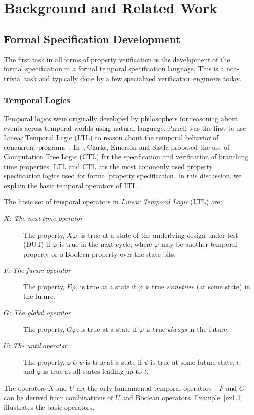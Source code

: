\documentclass[a4paper, 11pt]{article}
\begin{document}
\section{Background and Related Work} \label{sec2}
\subsection{Formal Specification Development} \label{sec2.1}
The first task in all forms of property verification is the development of
the formal specification in a formal temporal specification language. 
This is a non-trivial task and typically done by
a few specialized verification engineers today.

\subsubsection{Temporal Logics} \label{sec2.1.1}
Temporal logics were originally
developed by philosophers for reasoning about events across temporal worlds
using natural language. Pnueli was the first to use Linear Temporal Logic 
(LTL) to reason about the temporal behavior of concurrent
programs~\cite{pnueli:77}. 
In~\cite{ctl}, Clarke, Emerson and Sistla proposed the use of
Computation Tree Logic (CTL) for the specification and verification of branching
time properties. LTL and CTL are 
the most commonly used property specification logics used for formal
property specification. 
In this discussion, we explain the basic temporal operators of LTL.

The basic set of temporal operators in {\em Linear Temporal Logic} (LTL) are:
\begin{description}

\item[$X$: {\em The next-time operator}] The property, $X\varphi$, is true
    at a state of the underlying design-under-test (DUT) if $\varphi$
    is true in the next cycle, where $\varphi$ may be another temporal
    property or a Boolean property over the state bits. 

\item[$F$: {\em The future operator}] The property, $F\varphi$, is true at a
    state if $\varphi$ is true {\em sometime} (at some state) in the
    future.

\item[$G$: {\em The global operator}] The property, $G\varphi$, is true at a
    state if $\varphi$ is true {\em always} in the future.

\item[$U$: {\em The until operator}] The property, $\varphi\ U\ \psi$ is
    true at a state if $\psi$ is true at some future state, $t$, and
    $\varphi$ is true at all states leading up to $t$.

\end{description}
The operators $X$ and $U$ are the only fundamental temporal operators -- $F$
and $G$ can be derived from combinations of $U$ and Boolean operators. 
Example~\ref{ex1.1} illustrates the basic operators.
\end{document}
